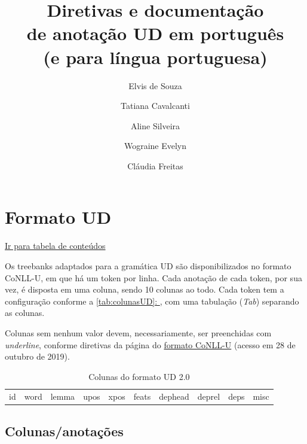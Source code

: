 \documentclass[output=paper,colorlinks,citecolor=brown]{langscibook}
\author{Elvis de Souza\and Tatiana Cavalcanti\and Aline Silveira\and Wograine Evelyn\and Cláudia Freitas}
\title{Diretivas e documentação\\
de anotação UD em português\\
(e para língua portuguesa)}
\newcommand*{\fullref}[1]{\hyperref[{#1}]{\autoref*{#1}: \nameref*{#1}}} %
\begin{document}
\maketitle


\tableofcontents

\chapter{Formato UD}\label{sec:formatoud}

\hyperlink{toc}{Ir para tabela de conteúdos\\}

Os treebanks adaptados para a gramática UD são disponibilizados no formato CoNLL-U, em que há um token por linha. Cada anotação de cada token, por sua vez, é disposta em uma coluna, sendo 10 colunas ao todo. Cada token tem a configuração conforme a \fullref{tab:colunasUD}, com uma tabulação (\textit{Tab}) separando as colunas.

Colunas sem nenhum valor devem, necessariamente, ser preenchidas com \textit{underline}, conforme diretivas da página do \href{https://universaldependencies.org/format}{formato CoNLL-U} (acesso em 28 de outubro de 2019).

\begin{table}
    \centering
    \begin{tabular}{c c c c c c c c c c}
        id & word & lemma & upos & xpos & feats & dephead & deprel & deps & misc\\
    \end{tabular}
    \caption{Colunas do formato UD 2.0}
    \label{tab:colunasUD}
\end{table}

\section{Colunas/anotações}\label{sec:colunas}
\end{document}

